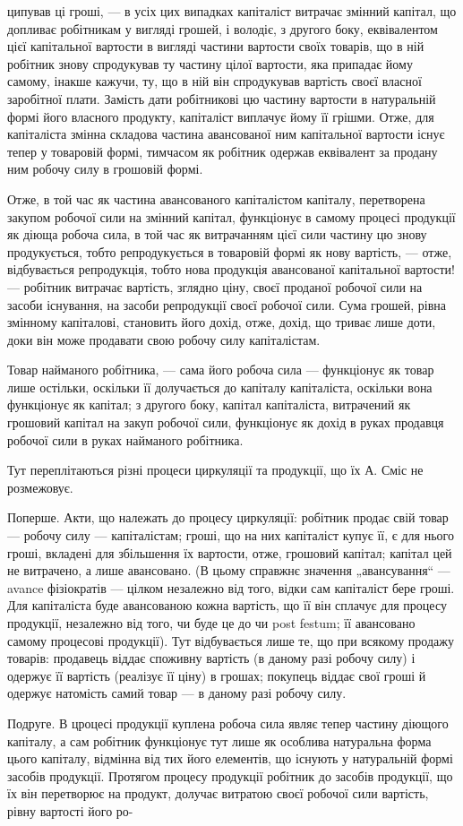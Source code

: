 ципував ці гроші, — в усіх цих випадках капіталіст витрачає змінний капітал, що допливає робітникам
у вигляді грошей, і володіє, з другого боку, еквівалентом цієї капітальної вартости в вигляді
частини вартости своїх товарів, що в ній робітник знову спродукував ту частину цілої вартости, яка
припадає йому самому, інакше кажучи, ту, що в ній він спродукував вартість своєї власної заробітної
плати. Замість дати робітникові цю частину вартости в натуральній формі його власного продукту,
капіталіст виплачує йому її грішми. Отже, для капіталіста змінна складова частина
авансованої ним капітальної вартости існує тепер у товаровій формі, тимчасом як робітник одержав
еквівалент за продану ним робочу силу в грошовій формі.

Отже, в той час як частина авансованого капіталістом капіталу, перетворена закупом робочої сили на
змінний капітал, функціонує в самому процесі продукції як діюща робоча сила, в той час як
витрачанням цієї сили частину цю знову продукується, тобто репродукується в товаровій формі як нову
вартість, — отже, відбувається репродукція, тобто нова продукція авансованої капітальної вартости! —
робітник витрачає вартість,
зглядно ціну, своєї проданої робочої сили на засоби існування, на засоби репродукції своєї робочої
сили. Сума грошей, рівна змінному капіталові, становить його дохід, отже, дохід, що триває лише
доти, доки він може продавати свою робочу силу капіталістам.

Товар найманого робітника, — сама його робоча сила — функціонує як товар лише остільки, оскільки її
долучається до капіталу капіталіста, оскільки вона функціонує як капітал; з другого боку, капітал
капіталіста, витрачений як грошовий капітал на закуп робочої сили, функціонує як дохід в руках
продавця робочої сили в руках найманого робітника.

Тут переплітаються різні процеси циркуляції та продукції, що їх А. Сміс не розмежовує.

Поперше. Акти, що належать до процесу циркуляції: робітник продає свій товар — робочу силу —
капіталістам; гроші, що на них капіталіст купує її, є для нього гроші, вкладені для збільшення їх
вартости, отже, грошовий капітал; капітал цей не витрачено, а лише авансовано. (В цьому справжнє
значення „авансування“ — avance фізіократів — цілком незалежно від того, відки сам капіталіст бере
гроші. Для капіталіста буде авансованою кожна вартість, що її він сплачує для процесу продукції,
незалежно від того, чи буде це до чи post festum; її авансовано самому процесові продукції). Тут
відбувається лише те, що при всякому продажу товарів: продавець віддає споживну вартість (в даному
разі робочу силу) і одержує її вартість (реалізує її ціну) в грошах; покупець віддає свої гроші й
одержує натомість самий товар — в даному разі робочу силу.

Подруге. В цроцесі продукції куплена робоча сила являє тепер частину діющого капіталу, а сам
робітник функціонує тут лише як особлива натуральна форма цього капіталу, відмінна від тих його
елементів, що існують у натуральній формі засобів продукції. Протягом процесу продукції робітник до
засобів продукції, що їх він перетворює на продукт, долучає витратою своєї робочої сили вартість,
рівну вартості його ро-
